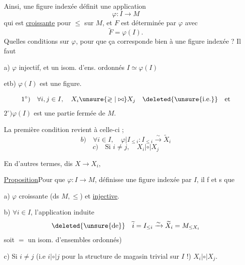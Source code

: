 Ainsi, une figure indexée  définit une application
\[
\varphi:I\longrightarrow M
\]
qui est \uline{croissante} pour $\leq$ sur $M$,  et $F$ est déterminée par $\varphi$  avec
\[
\widetilde F=\varphi(I).
\]
Quelles conditions sur $\varphi$, pour que ça corresponde bien à une figure indexée ? Il faut

 a) $\varphi$ injectif, et \deleted{$=$}  un isom. d'ens. ordonnés $I\simeq\varphi(I)$

et\qquad b) $\varphi(I)$ est une figure.   

\[
1^\circ)\quad\forall i,j\in I,\quad X_i\unsure{\gtrless|\bowtie}X_j\quad\deleted{\unsure{\text{i.e.}}}\quad\text{et}
\]
$2^\circ)$\quad $\varphi(I)$ est une partie fermée de $M$.

La première condition revient à celle-ci ; 
\[
b)\quad\forall i\in I,\quad\varphi|I_{\leq i}:I_{\leq i}\xrightarrow{\sim}\widetilde X_i
\]
\[
c)\quad\text{Si }i\ne j,\quad X_i\mathrel{|\circ|}X_j
\]

En d'autres termes,  dis $X\longrightarrow X_i$,

\uline{Proposition}\quad Pour que $\varphi:I\longrightarrow M$, définisse une figure indexée par $I$, il f et s que

 a) $\varphi$  croissante (ds $M,\leq$) et \uline{injective}.

 b) $\forall i\in I$, l'application induite
\[
\deleted{\unsure{\mathrm{de}}}\quad\widetilde i=I_{\leq i}\xrightarrow{\sim}\widetilde X_i=M_{\leq X_i}
\]
soit  $=$ un isom. d'ensembles ordonnés)

 c) Si $i\ne j$ (i.e $i\mathrel{|\circ|}j$ pour la structure de magasin trivial sur $I$ !) \unsure{:} $X_i\mathrel{|\circ|}X_j$.
